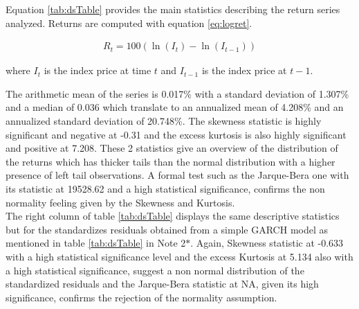 \documentclass[a4paper, twoside]{templates/ociamthesis}
\begin{document}
Equation \ref{tab:dsTable} provides the main statistics describing the return series analyzed. Returns are computed with equation \eqref{eq:logret}.

\begin{align}
R_{t}=100\left(\ln \left(I_{t}\right)-\ln \left(I_{t-1}\right)\right)
  \label{eq:logret}
\end{align}

\noindent where \(I_{t}\) is the index price at time \(t\) and \(I_{t-1}\) is the index price at \(t-1\).

\noindent The arithmetic mean of the series is 0.017\% with a standard deviation of 1.307\% and a median of 0.036 which translate to an annualized mean of 4.208\% and an annualized standard deviation of 20.748\%. The skewness statistic is highly significant and negative at -0.31 and the excess kurtosis is also highly significant and positive at 7.208. These 2 statistics give an overview of the distribution of the returns which has thicker tails than the normal distribution with a higher presence of left tail observations. A formal test such as the Jarque-Bera one with its statistic at 19528.62 and a high statistical significance, confirms the non normality feeling given by the Skewness and Kurtosis. ~\\

\noindent The right column of table \ref{tab:dsTable} displays the same descriptive statistics but for the standardizes residuals obtained from a simple GARCH model as mentioned in table \ref{tab:dsTable} in Note 2\(*\). Again, Skewness statistic at -0.633 with a high statistical significance level and the excess Kurtosis at 5.134 also with a high statistical significance, suggest a non normal distribution of the standardized residuals and the Jarque-Bera statistic at NA, given its high significance, confirms the rejection of the normality assumption.~\\
\end{document}
